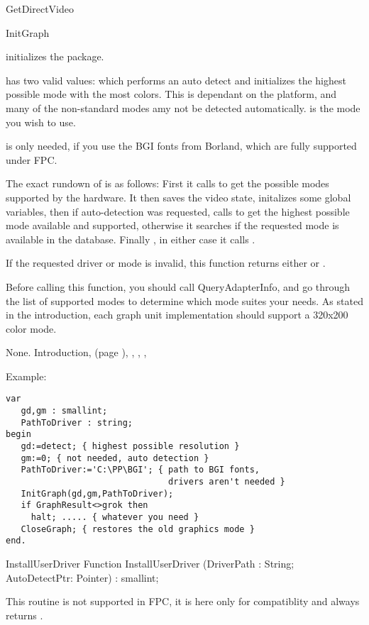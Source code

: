 \begin{function}{GetDirectVideo}
\begin{procedure}{InitGraph}
\Description

 initializes the  package.

 has two valid values:  which
performs an auto detect and initializes the highest possible mode with the most
colors. This is dependant on the platform, and many of the non-standard
modes amy not be detected automatically.  is the mode you
wish to use.

 is only needed, if you use the BGI fonts from
Borland, which are fully supported under FPC.

The exact rundown of  is as follows: First it calls
 to get the possible modes supported by the hardware.
It then saves the video state, initalizes some global variables, then if
auto-detection was requested, calls  to get the highest
possible mode available and supported, otherwise it searches if the requested
mode is available in the database. Finally , in either case it calls
.

If the requested driver or mode is invalid, this function returns either
 or .

Before calling this function, you should call QueryAdapterInfo, and
go through the list of supported modes to determine which mode suites
your needs. As stated in the introduction, each graph unit implementation
should support a 320x200 color mode.

\Errors
None.
\SeeAlso
Introduction, (page \pageref{se:Introduction}),
, , ,
\end{procedure}
Example:
\begin{verbatim}
var
   gd,gm : smallint;
   PathToDriver : string;
begin
   gd:=detect; { highest possible resolution }
   gm:=0; { not needed, auto detection }
   PathToDriver:='C:\PP\BGI'; { path to BGI fonts,
                                drivers aren't needed }
   InitGraph(gd,gm,PathToDriver);
   if GraphResult<>grok then
     halt; ..... { whatever you need }
   CloseGraph; { restores the old graphics mode }
end.
\end{verbatim}

\begin{function}{InstallUserDriver}
\Declaration
Function InstallUserDriver (DriverPath : String; AutoDetectPtr: Pointer) : smallint;

\Description
This routine is not supported in FPC, it is here only for compatiblity and
always returns .


\end{function}
\end{function}
